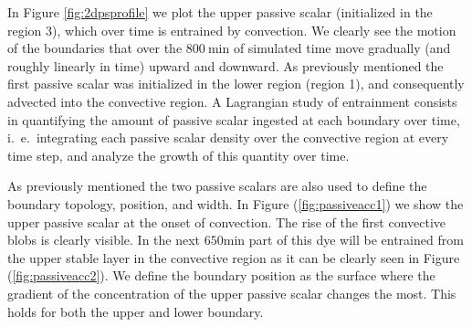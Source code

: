 In Figure \ref{fig:2dpsprofile} we plot the upper passive scalar (initialized in the region 3), which over time is entrained by convection. We clearly see the motion of the boundaries that over the $800 \ \mathrm{min}$ of simulated time move gradually (and roughly linearly in time) upward and downward. As previously mentioned the first passive scalar was initialized in the lower region (region 1), and consequently advected into the convective region. A Lagrangian study of entrainment consists in quantifying the amount of passive scalar ingested at each boundary over time, i.\ e.\ integrating each passive scalar density over the convective region at every time step, and analyze the growth of this quantity over time.

As previously mentioned the two passive scalars are also used to define the boundary topology, position, and width. In Figure (\ref{fig:passiveacc1}) we show the upper passive scalar at the onset of convection. The rise of the first convective blobs is clearly visible. In the next $650 \mathrm{min}$ part of this dye will be entrained from the upper stable layer in the convective region as it can be clearly seen in Figure (\ref{fig:passiveacc2}). We define the boundary position as the surface where the gradient of the concentration of the upper passive scalar changes the most. This holds for both the upper and lower boundary.
  
